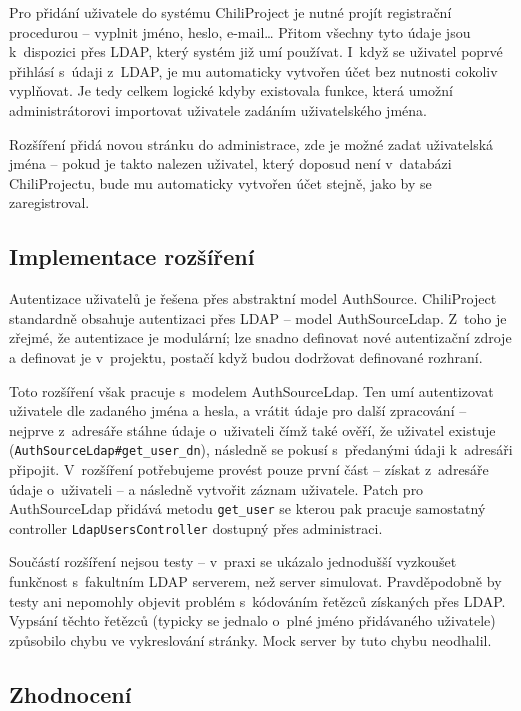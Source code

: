 \documentclass[thesis=B,czech]{FITthesis}[2012/05/02]
\begin{document}
Pro přidání uživatele do systému ChiliProject je nutné projít
registrační procedurou -- vyplnit jméno, heslo, e-mail\ldots{} Přitom
všechny tyto údaje jsou k~dispozici přes \gls{LDAP}, který systém již
umí používat. I~když se uživatel poprvé přihlásí s~údaji z~\gls{LDAP},
je mu automaticky vytvořen účet bez nutnosti cokoliv vyplňovat. Je tedy
celkem logické kdyby existovala funkce, která umožní administrátorovi
importovat uživatele zadáním uživatelského jména.

Rozšíření přidá novou stránku do administrace, zde je možné zadat
uživatelská jména -- pokud je takto nalezen uživatel, který doposud není
v~databázi ChiliProjectu, bude mu automaticky vytvořen účet stejně, jako
by se zaregistroval.

\subsection{Implementace rozšíření}

Autentizace uživatelů je řešena přes abstraktní model AuthSource.
ChiliProject standardně obsahuje autentizaci přes \gls{LDAP} -- model
AuthSourceLdap. Z~toho je zřejmé, že autentizace je modulární; lze
snadno definovat nové autentizační zdroje a definovat je v~projektu,
postačí když budou dodržovat definované rozhraní.

Toto rozšíření však pracuje s~modelem AuthSourceLdap. Ten umí
autentizovat uživatele dle zadaného jména a hesla, a vrátit údaje pro
další zpracování -- nejprve z~adresáře stáhne údaje o~uživateli čímž
také ověří, že uživatel existuje
(\lstinline!AuthSourceLdap#get_user_dn!), následně se pokusí s~předanými
údaji k~adresáři připojit. V~rozšíření potřebujeme provést pouze první
část -- získat z~adresáře údaje o~uživateli -- a následně vytvořit
záznam uživatele. Patch pro AuthSourceLdap přidává metodu
\lstinline!get_user! se kterou pak pracuje samostatný controller
\lstinline!LdapUsersController! dostupný přes administraci.

Součástí rozšíření nejsou testy -- v~praxi se ukázalo jednodušší
vyzkoušet funkčnost s~fakultním LDAP serverem, než server simulovat.
Pravděpodobně by testy ani nepomohly objevit problém s~kódováním řetězců
získaných přes LDAP. Vypsání těchto řetězců (typicky se jednalo o~plné
jméno přidávaného uživatele) způsobilo chybu ve vykreslování stránky.
Mock server by tuto chybu neodhalil.

\subsection{Zhodnocení}
\end{document}
